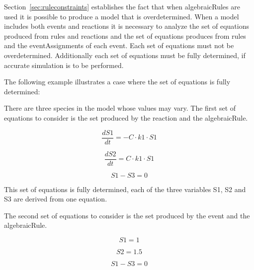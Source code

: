 Section~\ref{sec:ruleconstraints} establishes the fact that when 
algebraicRules are used it is possible to produce a model that is overdetermined.
When a model includes both events and reactions it is necessary to analyze
the set of equations produced from rules and reactions and the set of equations
produces from rules and the eventAssignments of each event.  Each set of equations 
must not be overdetermined.  Additionally each set of equations must be fully
determined, if accurate simulation is to be performed.

The following example illustrates a case where the set of equations is fully determined:


There are three species in the model whose values may vary.  The first set of equations
to consider is the set produced by the reaction and the algebraicRule.
\begin{linenomath}
\begin{equation*}
  \frac{d S1}{d t} = - C \cdot k1 \cdot S1
\end{equation*}
\end{linenomath}
\begin{linenomath}
\begin{equation*}
  \frac{d S2}{d t} = C \cdot k1 \cdot S1
\end{equation*}
\end{linenomath}
\begin{linenomath}
\begin{equation*}
  S1 - S3 = 0
\end{equation*}
\end{linenomath}

This set of equations is fully determined, \ie each of the three variables S1, S2 and S3
are derived from one equation.

The second set of equations to consider is the set produced by the event and 
the algebraicRule.
\begin{linenomath}
\begin{equation*}
  S1 = 1
\end{equation*}
\end{linenomath}
\begin{linenomath}
\begin{equation*}
  S2 = 1.5
\end{equation*}
\end{linenomath}
\begin{linenomath}
\begin{equation*}
  S1 - S3 = 0
\end{equation*}
\end{linenomath}


